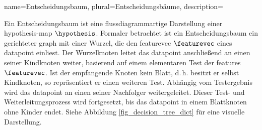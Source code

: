 {{{{
{name={Entscheidungsbaum}, plural={Entscheidungsbäume}, 
	description={Ein Entscheidungsbaum ist eine flussdiagrammartige Darstellung einer \gls{hypothesis}-\gls{map} $\hypothesis$. 
		Formaler betrachtet ist ein Entscheidungsbaum ein gerichteter \gls{graph} mit einer Wurzel, die den \gls{featurevec} $\featurevec$ 
		eines \gls{datapoint} einliest. Der Wurzelknoten leitet das \gls{datapoint} anschließend an einen seiner Kindknoten weiter, 
		basierend auf einem elementaren Test der \glspl{feature} $\featurevec$. 
		Ist der empfangende Knoten kein Blatt, d.\,h. besitzt er selbst Kindknoten, 
	  	so repräsentiert er einen weiteren Test. Abhängig vom Testergebnis wird das \gls{datapoint} 
	   	an einen seiner Nachfolger weitergeleitet. Dieser Test- und Weiterleitungsprozess wird fortgesetzt, 
	  	bis das \gls{datapoint} in einem Blattknoten ohne Kinder endet. 
	  	Siehe Abbildung \ref{fig_decision_tree_dict} für eine visuelle Darstellung.
		\begin{figure}[H]
		\begin{minipage}{.45\textwidth}
		\end{minipage}	
		\hspace*{15mm}
		\begin{minipage}{.45\textwidth}
		\hspace*{15mm}
		\begin{tikzpicture}

\end{tikzpicture}
\end{minipage}
\end{figure}}}}}}}
